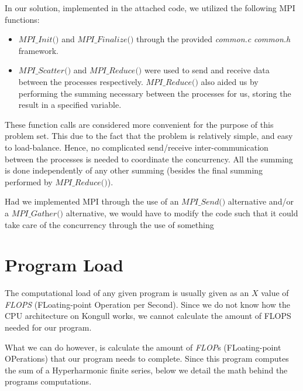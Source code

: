 \documentclass[fontsize=11pt,paper=a4,titlepage]{report}
\begin{document}
In our solution, implemented in the attached code, we utilized the following MPI functions:

\begin{itemize}
	\item{$\textit{MPI\_Init()}$ and $\textit{
MPI\_Finalize()}$ through the provided \textit{common.c} \textit{common.h} framework.}
	\item{$\textit{MPI\_Scatter()}$ and $\textit{MPI\_Reduce()}$ were used to send and receive data between the processes respectively. $\textit{MPI\_Reduce()}$ also aided us by performing the summing necessary between the processes for us, storing the result in a specified variable.}
\end{itemize}

These function calls are considered more convenient for the purpose of this
problem set. This due to the fact that the problem is relatively simple, and
easy to load-balance. Hence, no complicated send/receive inter-communication
between the processes is needed to coordinate the concurrency. All the summing
is done independently of any other summing (besides the final summing performed
by $\textit{MPI\_Reduce()}$).

Had we implemented MPI through the use of an $\textit{MPI\_Send()}$ alternative
and/or a $\textit{MPI\_Gather()}$ alternative, we would have to modify the code
such that it could take care of the concurrency through the use of something




\section{Program Load}

The computational load of any given program is usually given as an $X$ value of \textit{FLOPS} (FLoating-point Operation per Second). Since we do not know how the CPU architecture on Kongull works, we cannot calculate the amount of FLOPS needed for our program.

What we can do however, is calculate the amount of \textit{FLOP}s (FLoating-point OPerations) that our program needs to complete. Since this program computes the sum of a Hyperharmonic finite series, below we detail the math behind the programs computations.
\end{document}
